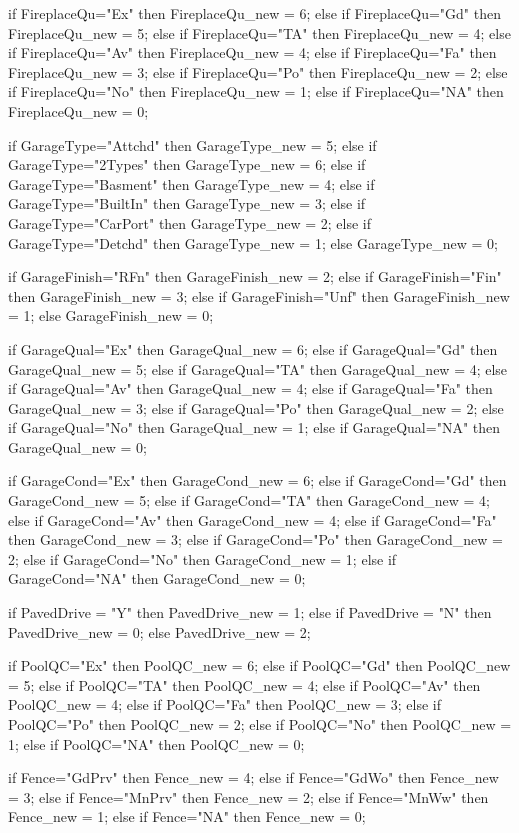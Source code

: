 		if FireplaceQu="Ex" 		then FireplaceQu_new = 6;
		else if FireplaceQu="Gd" 	then FireplaceQu_new = 5;
		else if FireplaceQu="TA" 	then FireplaceQu_new = 4;
		else if FireplaceQu="Av" 	then FireplaceQu_new = 4;
		else if FireplaceQu="Fa" 	then FireplaceQu_new = 3;
		else if FireplaceQu="Po" 	then FireplaceQu_new = 2;
		else if FireplaceQu="No" 	then FireplaceQu_new = 1;
		else if FireplaceQu="NA" 	then FireplaceQu_new = 0;


		if GarageType="Attchd" then GarageType_new = 5;
		else if GarageType="2Types" then GarageType_new = 6;
		else if GarageType="Basment" then GarageType_new = 4;
		else if GarageType="BuiltIn" then GarageType_new = 3;
		else if GarageType="CarPort" then GarageType_new = 2;
		else if GarageType="Detchd" then GarageType_new = 1;
		else  GarageType_new = 0;

		if GarageFinish="RFn" then GarageFinish_new = 2;
		else if GarageFinish="Fin" then GarageFinish_new = 3;
		else if GarageFinish="Unf" then GarageFinish_new = 1;
		else GarageFinish_new = 0;	

		if GarageQual="Ex" 		then GarageQual_new = 6;
		else if GarageQual="Gd" 	then GarageQual_new = 5;
		else if GarageQual="TA" 	then GarageQual_new = 4;
		else if GarageQual="Av" 	then GarageQual_new = 4;
		else if GarageQual="Fa" 	then GarageQual_new = 3;
		else if GarageQual="Po" 	then GarageQual_new = 2;
		else if GarageQual="No" 	then GarageQual_new = 1;
		else if GarageQual="NA" 	then GarageQual_new = 0;

		if GarageCond="Ex" 		then GarageCond_new = 6;
		else if GarageCond="Gd" 	then GarageCond_new = 5;
		else if GarageCond="TA" 	then GarageCond_new = 4;
		else if GarageCond="Av" 	then GarageCond_new = 4;
		else if GarageCond="Fa" 	then GarageCond_new = 3;
		else if GarageCond="Po" 	then GarageCond_new = 2;
		else if GarageCond="No" 	then GarageCond_new = 1;
		else if GarageCond="NA" 	then GarageCond_new = 0;
		
		if PavedDrive = "Y" then PavedDrive_new = 1;
		else if PavedDrive = "N" then PavedDrive_new = 0;
		else PavedDrive_new = 2;

		if PoolQC="Ex" 		then PoolQC_new = 6;
		else if PoolQC="Gd" 	then PoolQC_new = 5;
		else if PoolQC="TA" 	then PoolQC_new = 4;
		else if PoolQC="Av" 	then PoolQC_new = 4;
		else if PoolQC="Fa" 	then PoolQC_new = 3;
		else if PoolQC="Po" 	then PoolQC_new = 2;
		else if PoolQC="No" 	then PoolQC_new = 1;
		else if PoolQC="NA" 	then PoolQC_new = 0;

		if Fence="GdPrv" then Fence_new = 4;
		else if Fence="GdWo" then Fence_new = 3;
		else if Fence="MnPrv" then Fence_new = 2;
		else if Fence="MnWw" then Fence_new = 1;
		else if Fence="NA" then Fence_new = 0;

